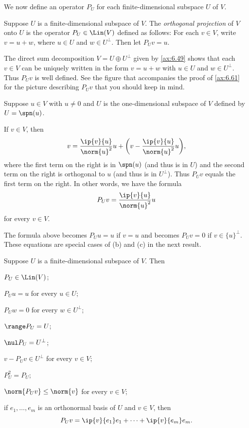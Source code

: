 We now define an operator $P_U$ for each finite-dimensional subspace $U$ of
$V$.

\begin{definition}\label{ax:6.55}
Suppose $U$ is a finite-dimensional subspace of $V$. The \emph{orthogonal
projection} of $V$ onto $U$ is the operator $P_U\in\Lin(V)$ defined as follows:
For each $v\in V$, write $v=u+w$, where $u\in U$ and $w\in U^\perp$. Then let
$P_Uv=u$.
\end{definition}

The direct sum decomposition $V=U\oplus U^\perp$ given by \ref{ax:6.49} shows
that each $v\in V$ can be uniquely written in the form $v=u+w$ with $u\in U$
and $w\in U^\perp$. Thus $P_Uv$ is well defined. See the figure that
accompanies the proof of \ref{ax:6.61} for the picture describing $P_Uv$ that
you should keep in mind.

\begin{example}\label{ax:6.56}
Suppose $u\in V$ with $u\ne0$ and $U$ is the one-dimensional subspace of $V$
defined by $U=\spn(u)$.

If $v\in V$, then
\[ v = \frac{\ip{v}{u}}{\norm{u}^2}u
     + \biggl(v-\frac{\ip{v}{u}}{\norm{u}^2}u\biggr), \]
where the first term on the right is in $\spn(u)$ (and thus is in $U$) and the
second term on the right is orthogonal to $u$ (and thus is in $U^\perp$). Thus
$P_Uv$ equals the first term on the right. In other words, we have the formula
\[ P_Uv = \frac{\ip{v}{u}}{\norm{u}^2}u \]
for every $v\in V$.

The formula above becomes $P_Uu=u$ if $v=u$ and becomes $P_Uv=0$ if
$v\in\{u\}^\perp$. These equations are special cases of (b) and (c) in the next
result.
\end{example}

\begin{result}\label{ax:6.57}
Suppose $U$ is a finite-dimensional subspace of $V$. Then
\begin{parts}
\item $P_U\in\Lin(V)$;
\item $P_Uu=u$ for every $u\in U$;
\item $P_Uw=0$ for every $w\in U^\perp$;
\item $\range P_U=U$;
\item $\nul P_U=U^\perp$;
\item $v-P_Uv\in U^\perp$ for every $v\in V$;
\item $P_U^2=P_U$;
\item $\norm{P_Uv}\le\norm{v}$ for every $v\in V$;
\item if $e_1,\dots,e_m$ is an orthonormal basis of $U$ and $v\in V$, then
  \[ P_Uv = \ip{v}{e_1}e_1+\cdots+\ip{v}{e_m}e_m. \]
\end{parts}
\end{result}

